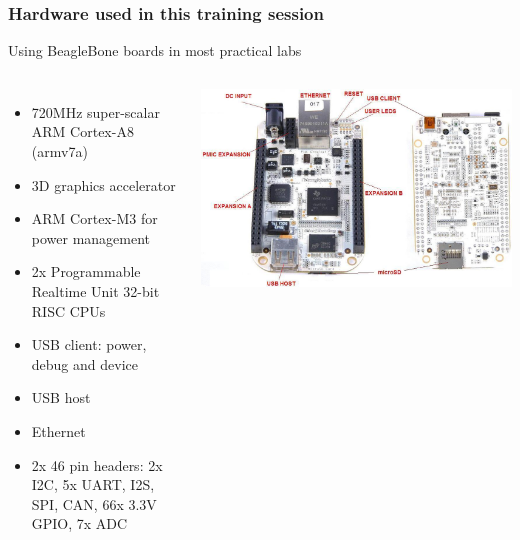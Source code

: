\begin{frame}
\frametitle{Hardware used in this training session}
  Using BeagleBone boards in most practical labs
  \begin{columns}
    \begin{itemize}
        \item 720MHz super-scalar ARM Cortex-A8 (armv7a)
        \item 3D graphics accelerator
        \item ARM Cortex-M3 for power management
        \item 2x Programmable Realtime Unit 32-bit RISC CPUs
        \item USB client: power, debug and device
        \item USB host
        \item Ethernet
        \item 2x 46 pin headers: 2x I2C, 5x UART, I2S, SPI, CAN, 66x 3.3V GPIO, 7x ADC
    \end{itemize}
    \includegraphics[width=\textwidth]{slides/beaglebone-board/beaglebone-board.jpg}
  \end{columns}
\end{frame}
